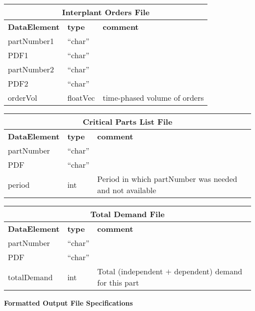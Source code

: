 \begin{tabular}{llp{4in}}
\multicolumn{3}{c}{{\bf Interplant Orders File}}\\ \hline\hline
{\bf DataElement} &  {\bf type}  &   {\bf comment} \\ \hline
partNumber1 &  ``char''     \\ 
PDF1   & ``char''  \\
partNumber2 &  ``char''     \\ 
PDF2   & ``char'' \\
orderVol & floatVec &  time-phased volume of orders \\
\end{tabular}

\begin{tabular}{llp{4in}}
\multicolumn{3}{c}{{\bf Critical Parts List File}}\\ \hline\hline
{\bf DataElement} &  {\bf type}  &   {\bf comment} \\ \hline
partNumber &  ``char''     \\ 
PDF   & ``char''  \\
period & int & Period in which partNumber was needed and not available
\end{tabular}

\vspace{.5in}

\begin{tabular}{llp{4in}}
\multicolumn{3}{c}{{\bf Total Demand File}}\\ \hline\hline
{\bf DataElement} &  {\bf type}  &   {\bf comment} \\ \hline
partNumber &  ``char''     \\ 
PDF   & ``char''  \\
totalDemand & int & Total (independent $+$ dependent) demand for this part
\end{tabular}


\clearpage
\noindent
{\bf Formatted Output File Specifications}

\vspace{.5in}

